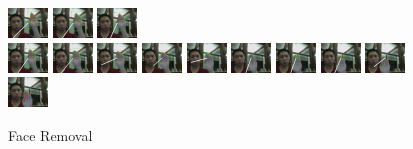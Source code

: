 \documentclass[12pt]{article}
\begin{document}
\begin{figure}[H]
\includegraphics[width=40px, height=30px]{../data/noface/img0037.jpg}
\includegraphics[width=40px, height=30px]{../data/noface/img0038.jpg}
\includegraphics[width=40px, height=30px]{../data/noface/img0039.jpg} \\
\includegraphics[width=40px, height=30px]{../data/noface/img0040.jpg}
\includegraphics[width=40px, height=30px]{../data/noface/img0041.jpg}
\includegraphics[width=40px, height=30px]{../data/noface/img0042.jpg}
\includegraphics[width=40px, height=30px]{../data/noface/img0043.jpg}
\includegraphics[width=40px, height=30px]{../data/noface/img0044.jpg}
\includegraphics[width=40px, height=30px]{../data/noface/img0045.jpg}
\includegraphics[width=40px, height=30px]{../data/noface/img0046.jpg}
\includegraphics[width=40px, height=30px]{../data/noface/img0047.jpg}
\includegraphics[width=40px, height=30px]{../data/noface/img0048.jpg}
\includegraphics[width=40px, height=30px]{../data/noface/img0049.jpg}
\label{seq-noface}
\caption{Face Removal}
\end{figure}
\end{document}
